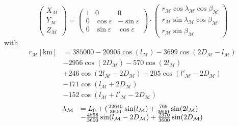 \documentclass[11pt,
               a4paper,
               bibtotoc,
               idxtotoc,
               headsepline,
               footsepline,
               footexclude,
               BCOR12mm,
               DIV13,
               openany,   %
               ]
               {scrbook}
\begin{document}
\begin{itemize}
\begin{equation}
\begin{pmatrix}
                X_{\mathcal M}\\
                Y_{\mathcal M}\\
                Z_{\mathcal M}
            \end{pmatrix} =
            \begin{pmatrix}
                1 & 0 & 0 \\
                0 & \cos\varepsilon & -\sin\varepsilon\\
                0 & \sin\varepsilon & \cos\varepsilon
            \end{pmatrix}
            \cdot
            \begin{pmatrix}
                r_{{\mathcal M}} \cos \lambda_{{\mathcal M}} \cos \beta_{{\mathcal M}}\\
                r_{{\mathcal M}} \sin \lambda_{{\mathcal M}} \cos \beta_{{\mathcal M}}\\
                r_{{\mathcal M}} \sin \beta_{{\mathcal M}}
            \end{pmatrix}
        \end{equation}
        with
        \begin{equation}
            \begin{array}{ll}
                r_{{\mathcal M}}[\mbox{km}] &= 385000-20905 \cos(l_{{{\mathcal M}}})-3699 \cos(2 D_{{{\mathcal M}}}-l_{{{\mathcal M}}}) \\
                &-2956 \cos(2 D_{{{\mathcal M}}})-570 \cos(2 l_{{{\mathcal M}}})\\
                &+246\cos(2 l_{{{\mathcal M}}}-2 D_{{{\mathcal M}}})-205 \cos(l'_{{{\mathcal M}}}-2 D_{{{\mathcal M}}})\\
                &-171 \cos(l_{{{\mathcal M}}}+2 D_{{{\mathcal M}}})\\
                &-152 \cos(l_{{{\mathcal M}}}+l'_{{{\mathcal M}}}-2 D_{{{\mathcal M}}})
            \end{array}
        \end{equation}
        \begin{equation}
            \begin{array}{ll}
                \begin{array}{ll}
                    \lambda_{\mathcal M} &= L_0+ ( {22640\over 3600} \sin(l_{\mathcal M})
                    + {769\over 3600} \sin(2 l_{\mathcal M})\\
                    &- {4856\over 3600} \sin(l_{\mathcal M} - 2 D_{\mathcal M})
                    + {2370\over 3600} \sin(2 D_{\mathcal M})\\

\end{array}
\end{array}
\end{equation}
\end{itemize}
\end{document}
